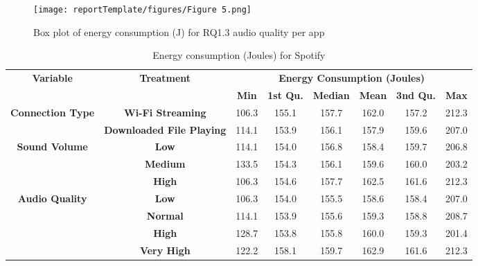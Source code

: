 \begin{figure}[htbp]
 \centering
 \texttt{[image: reportTemplate/figures/Figure 5.png]}\caption{Box plot of energy consumption (J) for RQ1.3 audio quality per app}
\end{figure}

\begin{table*}[t]
\centering
\caption{Energy consumption (Joules) for Spotify}
\label{table1}
\begin{tabular}{|c|c|c|c|c|c|c|c|}
\hline
\multirow{2}{*}{\textbf{Variable}}  & \multirow{2}{*}{\textbf{Treatment}} &  \multicolumn{6}{c|}{\textbf{Energy Consumption (Joules)}}\\
\cline{3-8}
& & \textbf{Min}& \textbf{1st Qu.} & \textbf{Median} & \textbf{Mean} & \textbf{3nd Qu.} & \textbf{Max}

\\
\hline

\multirow{2}{*}{\textbf{Connection Type}}  & \textbf{Wi-Fi Streaming} &  106.3
&155.1
&157.7
&162.0
&157.2
&212.3
\\
\cline{2-8}
&\textbf{Downloaded File Playing}
&114.1
&153.9
&156.1
&157.9
&159.6
&207.0
\\
\hline

\multirow{2}{*}{\textbf{Sound Volume}}  & \textbf{Low} &  
114.1
&154.0
&156.8
&158.4
&159.7
&206.8

\\
\cline{2-8}
&\textbf{Medium}
&133.5
&154.3
&156.1
&159.6
&160.0
&203.2
\\
\cline{2-8}
&\textbf{High}
&106.3
&154.6
&157.7
&162.5
&161.6
&212.3

\\
\hline

\multirow{2}{*}{\textbf{Audio Quality}}  & \textbf{Low} &  
106.3
&154.0
&155.5
&158.6
&158.4
&207.0

\\
\cline{2-8}
&\textbf{Normal}
&114.1
&153.9
&155.6
&159.3
&158.8
&208.7

\\
\cline{2-8}
&\textbf{High}
&128.7           
&153.8
&155.8
&160.0
&159.3
&201.4

\\
\cline{2-8}
&\textbf{Very High}
&122.2   
&158.1 
&159.7  
&162.9   
&161.6   
&212.3

\\
\hline

\end{tabular}
\label{table_MAP}
\end{table*}

